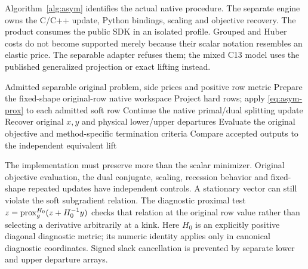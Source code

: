 Algorithm~\ref{alg:asym} identifies the actual native procedure. The separate
engine owns the C/C++ update, Python bindings, scaling and objective recovery.
The product consumes the public SDK in an isolated profile. Grouped and Huber
costs do not become supported merely because their scalar notation resembles
an elastic price. The separable adapter refuses them; the mixed C13 model uses
the published generalized projection or exact lifting instead.

\begin{algorithm}[htbp]
\caption{Apply side-specific scalar proximal updates in the original interval rows while preserving hard policy and independently recovering the requested objective and dual conditions.}\label{alg:asym}
\begin{algorithmic}[1]
\Require Admitted separable original problem, side prices and positive row metric
\State Prepare the fixed-shape original-row native workspace
\State Project hard rows; apply \eqref{eq:asym-prox} to each admitted soft row
\State Continue the native primal/dual splitting update
\EndFor
\State Recover original $x,y$ and physical lower/upper departures
\State Evaluate the original objective and method-specific termination criteria
\State Compare accepted outputs to the independent equivalent lift
\end{algorithmic}
\end{algorithm}

The implementation must preserve more than the scalar minimizer. Original
objective evaluation, the dual conjugate, scaling, recession behavior and
fixed-shape repeated updates have independent controls. A stationary vector
can still violate the soft subgradient relation. The diagnostic proximal test
$z=\operatorname{prox}_g^{H_0}(z+H_0^{-1}y)$ checks that relation at the original row value rather than
selecting a derivative arbitrarily at a kink. Here $H_0$ is an explicitly
positive diagonal diagnostic metric; its numeric identity applies only in
canonical diagnostic coordinates. Signed slack cancellation is
prevented by separate lower and upper departure arrays.

